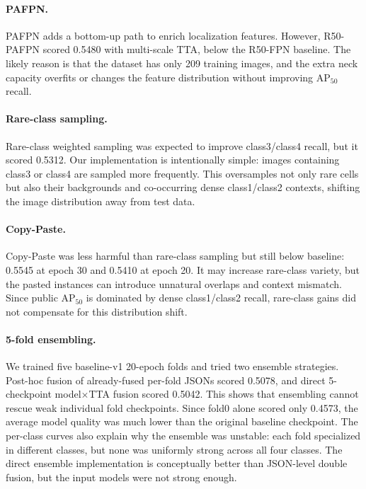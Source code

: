 \documentclass[10pt,twocolumn,letterpaper]{article}
\begin{document}
\paragraph{PAFPN.} PAFPN adds a bottom-up path to enrich localization features. However, R50-PAFPN scored 0.5480 with multi-scale TTA, below the R50-FPN baseline. The likely reason is that the dataset has only 209 training images, and the extra neck capacity overfits or changes the feature distribution without improving AP$_{50}$ recall.

\paragraph{Rare-class sampling.} Rare-class weighted sampling was expected to improve class3/class4 recall, but it scored 0.5312. Our implementation is intentionally simple: images containing class3 or class4 are sampled more frequently. This oversamples not only rare cells but also their backgrounds and co-occurring dense class1/class2 contexts, shifting the image distribution away from test data.

\paragraph{Copy-Paste.} Copy-Paste was less harmful than rare-class sampling but still below baseline: 0.5545 at epoch 30 and 0.5410 at epoch 20. It may increase rare-class variety, but the pasted instances can introduce unnatural overlaps and context mismatch. Since public AP$_{50}$ is dominated by dense class1/class2 recall, rare-class gains did not compensate for this distribution shift.

\paragraph{5-fold ensembling.} We trained five baseline-v1 20-epoch folds and tried two ensemble strategies. Post-hoc fusion of already-fused per-fold JSONs scored 0.5078, and direct 5-checkpoint model$\times$TTA fusion scored 0.5042. This shows that ensembling cannot rescue weak individual fold checkpoints. Since fold0 alone scored only 0.4573, the average model quality was much lower than the original baseline checkpoint. The per-class curves also explain why the ensemble was unstable: each fold specialized in different classes, but none was uniformly strong across all four classes. The direct ensemble implementation is conceptually better than JSON-level double fusion, but the input models were not strong enough.
\end{document}
